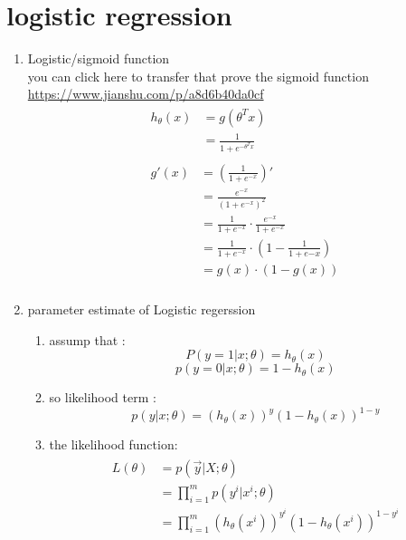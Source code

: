 \documentclass[12pt]{ctexart}%
\begin{document}
	\section{\quad logistic regression}
		\begin{enumerate}
			\item Logistic/sigmoid function\\
				you can click here to transfer that prove the sigmoid function  \url{https://www.jianshu.com/p/a8d6b40da0cf}
				\begin{align}
					\begin{split}
						h_\theta(x) &= g(\theta^T x) \\
									&= \frac{1}{1+e^{-\theta^T x}}
					\end{split}\\
					\begin{split}
						g'(x) &= (\frac{1}{1+e^{-x}})' \\
							  &= \frac{e^{-x}}{(1+e^{-x})^2}\\
							  &= \frac{1}{1+e^{-x}}\cdot\frac{e^{-x}}{1+e^{-x}}\\
							  &= \frac{1}{1+e^{-x}}\cdot(1 - \frac{1}{1+e{-x}})\\
							  &= g(x)\cdot (1-g(x))
					\end{split}\\
				\end{align}
			
			\item parameter estimate of Logistic regerssion
				\begin{enumerate}
					\item assump that :
										$$P(y=1|x;\theta) = h_\theta(x)$$
										$$p(y=0|x;\theta) = 1 - h_\theta(x)$$
										
					\item so likelihood term : $$p(y|x;\theta) = (h_\theta(x))^{y} (1-h_\theta(x))^{1-y}$$
					
					\item the likelihood function:
						  \begin{align}
						  	  \begin{split}
						  	  	  L(\theta) &= p(\vec{y}|X;\theta)\\
						  	  	  			&= \prod_{i=1}^{m}p(y^i|x^i;\theta)\\
						  	  	  			&= \prod_{i=1}^{m}(h_\theta(x^i))^{y^i} (1-h_\theta(x^i))^{1-y^i}
						  	  \end{split}
						  \end{align}
						  

\end{enumerate}
\end{enumerate}
\end{document}
